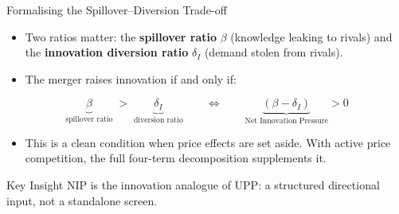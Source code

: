 \documentclass[10pt, aspectratio=169]{beamer}
\begin{document}
\begin{frame}{Formalising the Spillover–Diversion Trade-off}
  \begin{itemize}
    \item Two ratios matter: the \textbf{spillover ratio} $\beta$
          (knowledge leaking to rivals) and the
          \textbf{innovation diversion ratio} $\delta_I$
          (demand stolen from rivals).

    \item The merger raises innovation if and only if:
  \end{itemize}

  \[
    \underbrace{\beta}_{\text{spillover ratio}}
    \;>\;
    \underbrace{\delta_I}_{\text{diversion ratio}}
    \qquad \Longleftrightarrow \qquad
    \underbrace{(\beta - \delta_I)}_{\text{Net Innovation Pressure}} > 0
  \]

  \begin{itemize}
    \item This is a clean condition when price effects are set
          aside. With active price competition, the full
          four-term decomposition supplements it.
  \end{itemize}

  \begin{block}{Key Insight}
    NIP is the innovation analogue of UPP: a structured
    directional input, not a standalone screen.
  \end{block}
\end{frame}
\end{document}

